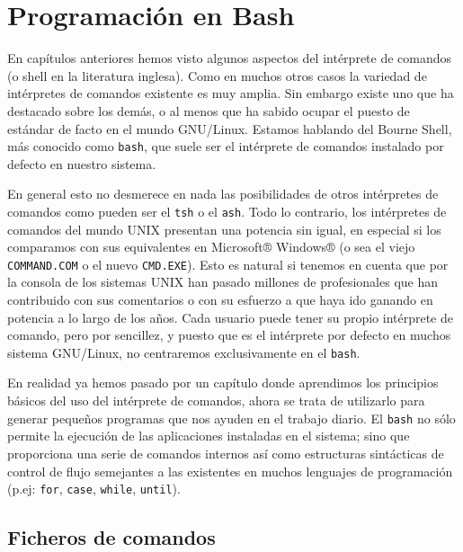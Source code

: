 

\chapter{Programación en Bash}
\label{bash.tex}

En capítulos anteriores hemos visto algunos aspectos del intérprete de
comandos  (o shell  en la  literatura inglesa).  Como en  muchos otros
casos la variedad de intérpretes  de comandos existente es muy amplia.
Sin embargo  existe uno que ha  destacado sobre los demás,  o al menos
que  ha sabido  ocupar el  puesto  de estándar  de facto  en el  mundo
GNU/Linux. Estamos hablando del {\sf  Bourne Shell}, más conocido como
{\tt  bash},  que  suele  ser el  intérprete  de  comandos
instalado por defecto en nuestro sistema.

En  general esto  no  desmerece  en nada  las  posibilidades de  otros
intérpretes de comandos  como pueden ser el {\tt  tsh} o el
{\tt ash}.  Todo lo contrario, los  intérpretes de comandos
del mundo  UNIX presentan una potencia  sin igual, en especial  si los
comparamos con sus equivalentes en Microsoft® Windows® (o sea el viejo
{\tt  COMMAND.COM} o  el  nuevo  {\tt CMD.EXE}).  Esto  es natural  si
tenemos en cuenta  que por la consola de los  sistemas UNIX han pasado
millones de  profesionales que han  contribuido con sus  comentarios o
con su esfuerzo a  que haya ido ganando en potencia a  lo largo de los
años. Cada usuario  puede tener su propio intérprete  de comando, pero
por sencillez,  y puesto que  es el  intérprete por defecto  en muchos
sistema GNU/Linux, no centraremos exclusivamente en el {\tt bash}.

En  realidad ya  hemos pasado  por  un capítulo  donde aprendimos  los
principios básicos del uso del  intérprete de comandos, ahora se trata
de utilizarlo  para generar  pequeños programas que  nos ayuden  en el
trabajo  diario. El {\tt  bash} no  sólo  permite la  ejecución de las
aplicaciones instaladas en el sistema;  sino que proporciona una serie
de comandos  internos así como  estructuras sintácticas de  control de
flujo semejantes a las existentes  en muchos lenguajes de programación
(p.ej: {\tt for}, {\tt case}, {\tt while}, {\tt until}).


\section{Ficheros de comandos}

